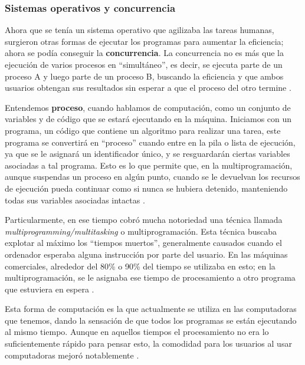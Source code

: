 \documentclass[letterpaper,12pt,oneside]{book}
\begin{document}
        \subsubsection{Sistemas operativos y concurrencia}
        
		Ahora que se tenía un sistema operativo que agilizaba las tareas humanas, surgieron otras formas de ejecutar
		los programas para aumentar la eficiencia; ahora se podía conseguir la \textbf{concurrencia}. La concurrencia no es más que la ejecución de varios
		procesos en ``simultáneo'', es decir, se ejecuta parte de un proceso A y luego parte de un proceso B, buscando la eficiencia y que ambos usuarios obtengan
		sus resultados sin esperar a que el proceso del otro termine \cite{tanenbaum_modern_2002}.
  
        Entendemos \textbf{proceso}, cuando hablamos de computación, como un conjunto de variables y de código que
		se estará ejecutando en la máquina. Iniciamos con un programa, un código que contiene un algoritmo para realizar una tarea, este programa se convertirá en ``proceso'' cuando entre en la pila o lista de ejecución, ya que se le asignará un identificador único,
		y se resguardarán ciertas variables asociadas a tal programa. Esto es lo que permite que, en la multiprogramación,  aunque suspendas un proceso en algún punto,
		cuando se le devuelvan los recursos de ejecución pueda continuar como si nunca se hubiera detenido, manteniendo todas sus variables asociadas intactas \cite{tanenbaum_modern_2002}.
		
		
		Particularmente, en ese tiempo cobró mucha notoriedad una técnica llamada \textit{multiprogramming/multitasking} o multiprogramación.
		Esta técnica buscaba explotar al máximo los ``tiempos muertos'', generalmente causados cuando el ordenador esperaba alguna instrucción por
		parte del usuario. En las máquinas comerciales, alrededor del 80\% o 90\% del tiempo se utilizaba en esto; en  la multiprogramación, se le 
		asignaba ese tiempo
		de procesamiento a otro programa que estuviera en espera \cite{tanenbaum_modern_2002}.
  
        Esta forma de computación es la que actualmente se utiliza en las computadoras que tenemos, dando
		la sensación de que todos los programas  se  están ejecutando al mismo tiempo. Aunque en aquellos tiempos el procesamiento no era
		lo suficientemente rápido para pensar esto, la comodidad para los usuarios al usar computadoras mejoró notablemente \cite{tanenbaum_modern_2002}.
		
		
\end{document}
